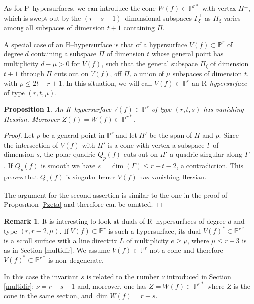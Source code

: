 \documentclass[11pt]{article}   %
\newtheorem{Proposition}[Theorem]{Proposition}
\theoremstyle{definition}
\newtheorem{Remark}[Theorem]{Remark}
\numberwithin{Theorem}{section} \numberwithin{equation}{section}
\newcommand{\Proj}{{\mathbb P}}
\newcommand{\p}{{\mathbb P}}
\begin{document}
{As for P--hypersurfaces, we can introduce the cone $W(f)\subset\p^{r*}$ with vertex
$\Pi^ \perp$, which is swept out by the $(r-s-1)$--dimensional subspaces $\Gamma_\xi^ \perp$
as $\Pi_\xi$  varies among all subspaces of dimension $t+1$ containing
$\Pi$.

A special case of an H--hypersurface is that of a hypersurface
$V(f)\subset\p^r$ of degree $d$ containing a subspace  $\Pi$ of dimension $t$
whose general point has multiplicity $d-\mu>0$ for $V(f)$, such that
the general subspace $\Pi_\xi$ of dimension $t+1$ through $\Pi$ cuts
out on $V(f)$, off $\Pi$, a union of $\mu$ subspaces of dimension
$t$, with $\mu\leq 2t-r+1$.  In this situation, we will call $V(f)\subset\p^r$
an R--{\it hypersurface\/} of type $(r,t,\mu)$.


\begin{Proposition}\label{Dhyper} An {\rm H}--hypersurface $V(f)\subset\p^r$ of type
$(r,t,s)$ has vanishing Hessian. Moreover $Z(f)=W(f)\subset\p^{r*}$.
\end{Proposition}

\begin{proof} Let $p$ be a general point in $\Proj^ r$ and let $\Pi'$ be
the span of $\Pi$ and $p$. Since the intersection of $V(f)$ with $\Pi'$
is a cone with vertex a subspace $\Gamma$ of dimension $s$, the polar
quadric $Q_p(f)$ cuts out on $\Pi'$ a quadric singular along $\Gamma$.
If $Q_p(f)$ is smooth we have $s=\dim(\Gamma)\leq r-t-2$, a
contradiction. This proves that $Q_p(f)$ is singular hence $V(f)$ has
vanishing Hessian.

The argument for the second assertion is similar to the one in the
proof of Proposition \ref {Pzeta} and therefore can be omitted. \end{proof}


\begin{Remark} \label {dualrig} It is interesting to look at duals of
R--hypersurfaces of degree $d$ and type $(r,r-2,\mu)$. If
$V(f)\subset\p^r$ is such a hypersurface, its dual $V(f)^
*\subset\p^{r*}$ is a scroll surface with a line directrix $L$ of
multiplicity $e\geq \mu$,  where $\mu\leq
r-3$ is as in { Section} \ref {multidir}. We assume
$V(f)\subset\p^r$ not a cone and therefore $V(f)^ *\subset\p^{r*}$
is non--degenerate.

In this case the invariant $s$ is related to the number $\nu$
introduced in  {Section}
\ref{multidir}: $\nu=r-s-1$ {and, moreover, one has
$Z=W(f)\subset\p^{r*}$ where $Z$ is the cone in the same section,
and} $\dim W(f)=r-s$.


\end{Remark}}
\end{document}
